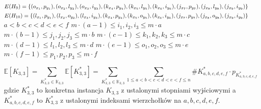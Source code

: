 \documentclass{article}
\begin{document}
\begin{itemize}
    \subitem $E(H_9) = \{ (o_{x_1}, p_{y_1}), (o_{x_2}, l_{y_2}), (o_{x_3}, i_{y_3}), \newline (k_{x_4}, p_{y_4}), (k_{x_5}, l_{y_5}), (k_{x_6}, i_{y_6}), (j_{x_7}, p_{y_7}), (j_{x_8}, l_{y_8}), (j_{x_9}, i_{y_9}) \}$
    \subitem $E(H_{10}) = \{ (l_{x_1}, p_{y_1}), (l_{x_2}, o_{y_2}), (l_{x_3}, i_{y_3}), \newline (k_{x_4}, p_{y_4}), (k_{x_5}, o_{y_5}), (k_{x_6}, i_{y_6}), (j_{x_7}, p_{y_7}), (j_{x_8}, o_{y_8}), (j_{x_9}, i_{y_9}) \}$
    \newline
    \subitem $a < b < c < d < e < f$
    \subitem $m \cdot (a-1) \leq i_1,i_2,i_3 \leq m \cdot a$
    \subitem $m \cdot (b-1) \leq j_1,j_2,j_3 \leq m \cdot b$
    \subitem $m \cdot (c-1) \leq k_1,k_2,k_3 \leq m \cdot c$
    \subitem $m \cdot (d-1) \leq l_1,l_2,l_3 \leq m \cdot d$
    \subitem $m \cdot (e-1) \leq o_1,o_2,o_3 \leq m \cdot e$
    \subitem $m \cdot (f-1) \leq p_1,p_2,p_3 \leq m \cdot f$
\end{itemize}

\begin{dmath}
  \mathbb{E}[K_{3,3}] = \sum_{K_{3,3}^* \in \mathbb{K}_{3,3}} \mathbb{E}[K_{3,3}^*] =
  \sum_{K_{3,3}^* \in \mathbb{K}_{3,3}} \sum_{1 \leq a < b < c < d < e < f \leq n} \#K_{a,b,c,d,e,f}^* \cdot p_{K_{a,b,c,d,e,f}^*}
\end{dmath}
gdzie $K_{3,3}^*$ to konkretna instancja $K_{3,3}$ z ustalonymi stopniami wyjściowymi \newline
a $K_{a,b,c,d,e,f}^*$ to $K_{3,3}^*$ z ustalonymi indeksami wierzchołków na $a,b,c,d,e,f$.
\end{document}
